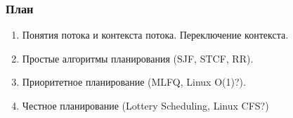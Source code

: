 \begin{frame}
\frametitle{План}

\begin{enumerate}
  \item Понятия потока и контекста потока. Переключение контекста.
  \item Простые алгоритмы планирования (SJF, STCF, RR).
  \item Приоритетное планирование (MLFQ, Linux O(1)?).
  \item Честное планирование (Lottery Scheduling, Linux CFS?)
\end{enumerate}
\end{frame}
